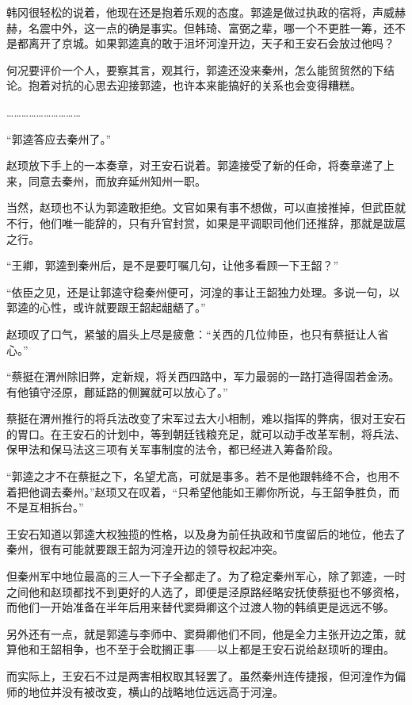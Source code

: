 韩冈很轻松的说着，他现在还是抱着乐观的态度。郭逵是做过执政的宿将，声威赫赫，名震中外，这一点的确是事实。但韩琦、富弼之辈，哪一个不更胜一筹，还不是都离开了京城。如果郭逵真的敢于沮坏河湟开边，天子和王安石会放过他吗？

何况要评价一个人，要察其言，观其行，郭逵还没来秦州，怎么能贸贸然的下结论。抱着对抗的心思去迎接郭逵，也许本来能搞好的关系也会变得糟糕。

…………………………

“郭逵答应去秦州了。”

赵顼放下手上的一本奏章，对王安石说着。郭逵接受了新的任命，将奏章递了上来，同意去秦州，而放弃延州知州一职。

当然，赵顼也不认为郭逵敢拒绝。文官如果有事不想做，可以直接推掉，但武臣就不行，他们唯一能辞的，只有升官封赏，如果是平调职司他们还推辞，那就是跋扈之行。

“王卿，郭逵到秦州后，是不是要叮嘱几句，让他多看顾一下王韶？”

“依臣之见，还是让郭逵守稳秦州便可，河湟的事让王韶独力处理。多说一句，以郭逵的心性，或许就要跟王韶起龃龉了。”

赵顼叹了口气，紧皱的眉头上尽是疲惫：“关西的几位帅臣，也只有蔡挺让人省心。”

“蔡挺在渭州除旧弊，定新规，将关西四路中，军力最弱的一路打造得固若金汤。有他镇守泾原，鄜延路的侧翼就可以放心了。”

蔡挺在渭州推行的将兵法改变了宋军过去大小相制，难以指挥的弊病，很对王安石的胃口。在王安石的计划中，等到朝廷钱粮充足，就可以动手改革军制，将兵法、保甲法和保马法这三项有关军事制度的法令，都已经进入筹备阶段。

“郭逵之才不在蔡挺之下，名望尤高，可就是事多。若不是他跟韩绛不合，也用不着把他调去秦州。”赵顼又在叹着，“只希望他能如王卿你所说，与王韶争胜负，而不是互相拆台。”

王安石知道以郭逵大权独揽的性格，以及身为前任执政和节度留后的地位，他去了秦州，很有可能就要跟王韶为河湟开边的领导权起冲突。

但秦州军中地位最高的三人一下子全都走了。为了稳定秦州军心，除了郭逵，一时之间他和赵顼都找不到更好的人选了，即便是泾原路经略安抚使蔡挺也不够资格，而他们一开始准备在半年后用来替代窦舜卿这个过渡人物的韩缜更是远远不够。

另外还有一点，就是郭逵与李师中、窦舜卿他们不同，他是全力主张开边之策，就算他和王韶相争，也不至于会耽搁正事——以上都是王安石说给赵顼听的理由。

而实际上，王安石不过是两害相权取其轻罢了。虽然秦州连传捷报，但河湟作为偏师的地位并没有被改变，横山的战略地位远远高于河湟。

